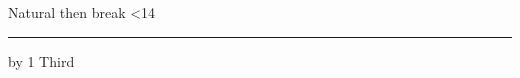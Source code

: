 \documentclass{pnpcards}
\begin{document}
\begin{card}{Natural then break}
\loop\ifnum\PageLimitLine<14
    \rule{1pt}{6mm}\par
    \advance\PageLimitLine by 1
\repeat
\newpage Third
\end{card}
\end{document}
